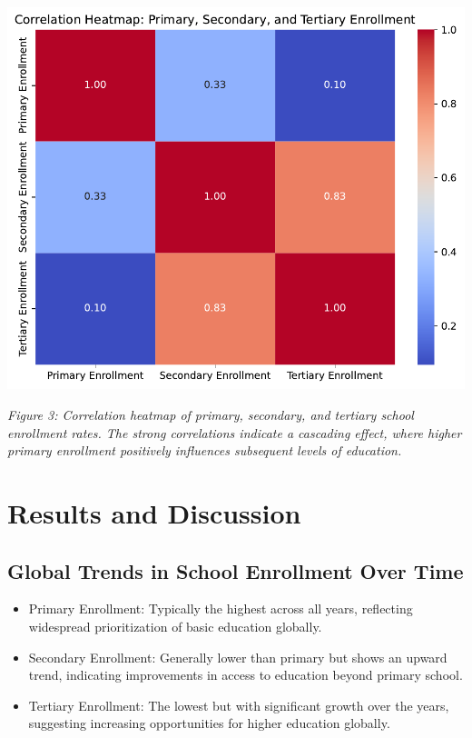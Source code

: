 \documentclass[
  letterpaper,
  DIV=11,
  numbers=noendperiod]{scrartcl}
\providecommand{\tightlist}{%
  \setlength{\itemsep}{0pt}\setlength{\parskip}{0pt}}\usepackage{longtable,booktabs,array}
\begin{document}
\includegraphics{report_files/figure-pdf/cell-5-output-1.pdf}

\emph{Figure 3: Correlation heatmap of primary, secondary, and tertiary
school enrollment rates. The strong correlations indicate a cascading
effect, where higher primary enrollment positively influences subsequent
levels of education.}

\section{Results and Discussion}\label{results-and-discussion}

\subsection{Global Trends in School Enrollment Over
Time}\label{global-trends-in-school-enrollment-over-time-1}

\begin{itemize}
\tightlist
\item
  Primary Enrollment: Typically the highest across all years, reflecting
  widespread prioritization of basic education globally.
\item
  Secondary Enrollment: Generally lower than primary but shows an upward
  trend, indicating improvements in access to education beyond primary
  school.
\item
  Tertiary Enrollment: The lowest but with significant growth over the
  years, suggesting increasing opportunities for higher education
  globally.
\end{itemize}
\end{document}
